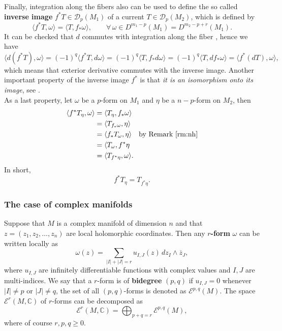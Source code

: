 Finally, integration along the fibers also can be used to define the so called {\bf inverse image} $f^*T\in \mathcal{D}_p(M_1)$ of a current $T\in \mathcal{D}_p(M_2)$, which is defined by
$$\langle f^*T,\omega \rangle = \langle T,f_*\omega \rangle, \qquad \forall \, \omega \in D^{m_1-p}(M_1)=D^{m_2-p+r}(M_1).$$
It can be checked that $d$ commutes with integration along the fiber \cite[Theorem 6.14.1]{bott}, hence we have
$$\langle d(f^*T),\omega\rangle = (-1)^q \langle f^*T,d\omega\rangle = (-1)^q \langle T,f_* d\omega\rangle = (-1)^q \langle T, df_*\omega \rangle = \langle f^*(dT),\omega \rangle,$$
which means that exterior derivative commutes with the inverse image. Another important property of the inverse image $f^*$ is that {\it it is an isomorphism onto its image}, see \cite[Proposition 3.2]{fornaes}.\\

As a last property, let $\omega$ be a $p$-form on $M_1$ and $\eta$ be a $n-p$-form on $M_2$, then
\begin{align*}
\langle f^* T_{\eta}, \omega \rangle &= \langle T_\eta , f_*\omega\rangle\\
&= \langle T_{f_*\omega},\eta \rangle \\
&= \langle f_*T_\omega,\eta \rangle \quad \text{by Remark \ref{rm:nh}}\\
&= \langle T_\omega,f^*\eta\\
&= \langle T_{f^{*}\eta},\omega \rangle.\\
\end{align*}
In short,
\begin{equation}\label{laecu}
f^*T_\eta = T_{f^*\eta}.
\end{equation}

\subsubsection{The case of complex manifolds}
Suppose that $M$ is a {\emph complex manifold} of dimension $n$ and that $z=(z_1,z_2,\dots,z_n)$ are local holomorphic coordinates. Then any {\bf $r$-form} $\omega$ can be written locally as 
$$\omega(z) = \sum_{|I|+|J|=r} u_{I,J}(z)\, dz_I\wedge \overline{z}_J,$$
where $u_{I,J}$ are infinitely differentiable functions with complex values and $I,J$ are multi-indices. We say that a $r$-form is of {\bf bidegree} $(p,q)$ if $u_{I,J}=0$ whenever $|I|\neq p$ or $|J| \neq q$, the set of all $(p,q)$-forms is denoted as $\mathcal{E}^{p,q}(M)$. The space $\mathcal{E}^r(M,\mathbb{C})$ of $r$-forms can be decomposed as
$$\mathcal{E}^r(M,\mathbb{C}) = \bigoplus_{p+q=r} \mathcal{E}^{p,q}(M),$$
where of course $r,p,q\geq 0$.\\

